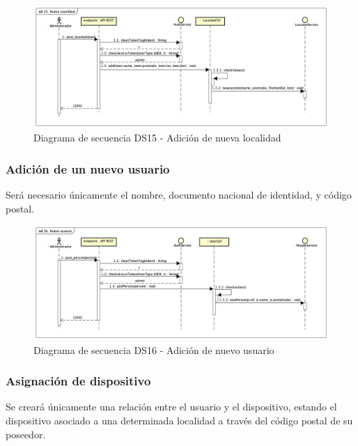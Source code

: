 \begin{figure}[H]
    \centering
    \includegraphics[width=14cm]{./img/sequence/diagram/NuevaLocalidad.png}
    \caption{Diagrama de secuencia DS15 - Adición de nueva localidad}
    \label{fig:seq.AddLocal}
\end{figure}

\subsubsection{Adición de un nuevo usuario}

Será necesario únicamente el nombre, documento nacional de identidad, y código postal.

\begin{figure}[H]
    \centering
    \includegraphics[width=14cm]{./img/sequence/diagram/NuevoUsuario.png}
    \caption{Diagrama de secuencia DS16 - Adición de nuevo usuario}
    \label{fig:seq.AddUser}
\end{figure}

\subsubsection{Asignación de dispositivo}

Se creará únicamente una relación entre el usuario y el dispositivo, estando el dispositivo asociado a una determinada localidad a través del código postal de su poseedor.

